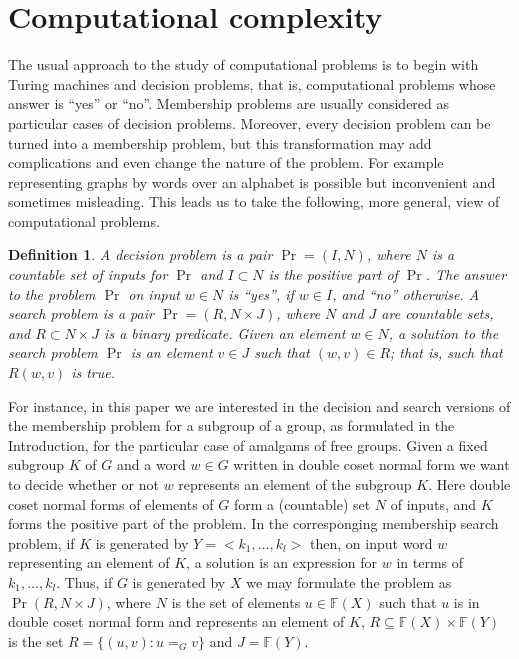 \documentclass[a4paper,12pt]{article}
\newtheorem{definition}[theorem]{Definition}
\numberwithin{equation}{section}
\numberwithin{figure}{section}
\newcommand{\FF}{\ensuremath{\mathbb{F}}}
\begin{document}
\section{Computational complexity}\label{sec:TC}
The usual approach to the study of computational problems is to
begin with Turing machines and decision
problems, that is, computational problems whose answer is ``yes'' or
``no''. Membership problems are usually considered as particular 
cases of decision problems.
Moreover, every decision problem can be turned into a membership
problem, but this transformation may add complications and even
change the nature of the problem. For example representing graphs by
words over an alphabet is possible but inconvenient and sometimes
misleading. This leads us to take the following, more general, view of computational
problems.
\begin{definition}
A \emph{decision problem} is a pair $\Pr = (I,N)$, where $N$ is a countable
set of \emph{inputs} for $\Pr$ and $I\subset N$ is the \emph{positive part} of
$\Pr$. The \emph{answer} to the problem $\Pr$ on  input $w\in N$ is ``yes'', 
if $w\in I$, 
and ``no'' otherwise. A \emph{search problem} is a pair 
$\Pr = (R,N\times J)$, where $N$ and $J$
are countable sets, and $R\subset N\times J$ is a binary predicate.
Given an element $w\in N$, a \emph{solution} to the search problem 
$\Pr$ is an element $v\in J$ such
that $(w,v)\in R$; that is, such that $R(w,v)$ is true.
\end{definition}

For instance, in this paper we are interested in the decision and search 
versions of the membership problem for a subgroup of a group, as formulated
in the Introduction, for the particular case of amalgams of free groups. 
Given 
 a fixed subgroup $K$ of $G$ and a word $w \in G$ written in 
double coset normal form we want to decide
whether or not $w$ represents an element of  the subgroup $K$. 
Here double coset normal forms of elements of $G$ form a (countable) 
set $N$ of inputs, and $K$ forms the positive part of the problem. 
In  the corresponging membership search problem, if $K$ is    
generated by $Y=<k_1, \ldots, k_l>$ then, on input word $w$ representing an element
of $K$, a solution is an expression for $w$ in terms of $k_1, \ldots, k_l$.
Thus, if $G$ is generated by $X$ we may formulate the problem as 
$\Pr(R,N\times J)$, where $N$ is the set of elements $u\in \FF(X)$ such 
that $u$ is in double coset normal form and represents an element of $K$, 
$R\subseteq \FF(X)\times \FF(Y)$ is the set $R=\{(u,v): u=_G v\}$ and 
$J=\FF(Y)$.
\end{document}
